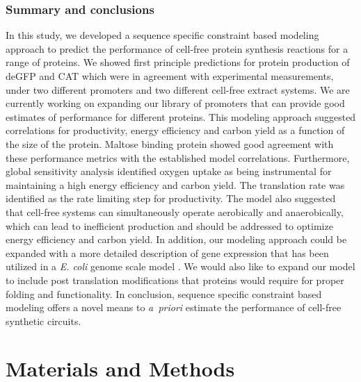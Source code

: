 \documentclass[journal=asbcd6,manuscript=article]{achemso}
\begin{document}
\subsubsection{Summary and conclusions}
In this study, we developed a sequence specific constraint based modeling approach to predict the performance of cell-free protein synthesis reactions for a range of proteins. We showed first principle predictions for protein production of deGFP and CAT which were in agreement with experimental measurements, under two different promoters and two different cell-free extract systems.
We are currently working on expanding our library of promoters that can provide good estimates of performance for different proteins.
This modeling approach suggested correlations for productivity, energy efficiency and carbon yield as a function of the size of the protein.
Maltose binding protein showed good agreement with these performance metrics with the established model correlations.
Furthermore, global sensitivity analysis identified oxygen uptake as being instrumental for maintaining a high energy efficiency and carbon yield.
The translation rate was identified as the rate limiting step for productivity.
The model also suggested that cell-free systems can simultaneously operate aerobically and anaerobically, which can lead to inefficient production and should be addressed to optimize energy efficiency and carbon yield.
In addition, our modeling approach could be expanded with a more detailed description of gene expression that has been utilized in a \emph{E. coli} genome scale model \cite{Brien693}.
We would also like to expand our model to include post translation modifications that proteins would require for proper folding and functionality.
In conclusion, sequence specific constraint based modeling offers a novel means to \emph{a~priori} estimate the performance of cell-free synthetic circuits.

\clearpage

\section*{Materials and Methods}
\end{document}

